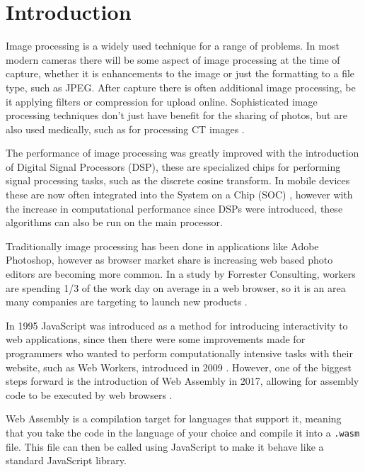 \documentclass[12pt,a4paper]{article}
\begin{document}
\section{Introduction}

Image processing is a widely used technique for a range of problems. In most modern cameras there will be some aspect of image processing at the time of capture, whether it is enhancements to the image or just the formatting to a file type, such as JPEG. After capture there is often additional image processing, be it applying filters or compression for upload online. Sophisticated image processing techniques don't just have benefit for the sharing of photos, but are also used medically, such as for processing CT images \cite{zhang2017applications}.

The performance of image processing was greatly improved with the introduction of Digital Signal Processors (DSP), these are specialized chips for performing signal processing tasks, such as the discrete cosine transform. In mobile devices these are now often integrated into the System on a Chip (SOC) \cite{angoletta2008digital}, however with the increase in computational performance since DSPs were introduced, these algorithms can also be run on the main processor.

Traditionally image processing has been done in applications like Adobe Photoshop, however as browser market share is increasing web based photo editors are becoming more common. In a study by Forrester Consulting, workers are spending 1/3 of the work day on average in a web browser, so it is an area many companies are targeting to launch new products \cite{cloud_worker}.


In 1995 JavaScript was introduced as a method for introducing interactivity to web applications, since then there were some improvements made for programmers who wanted to perform computationally intensive tasks with their website, such as Web Workers, introduced in 2009 \cite{Hickson}. However, one of the biggest steps forward is the introduction of Web Assembly in 2017, allowing for assembly code to be executed by web browsers \cite{haas2017bringing}.

Web Assembly is a compilation target for languages that support it, meaning that you take the code in the language of your choice and compile it into a \texttt{.wasm} file. This file can then be called using JavaScript to make it behave like a standard JavaScript library.
\end{document}

